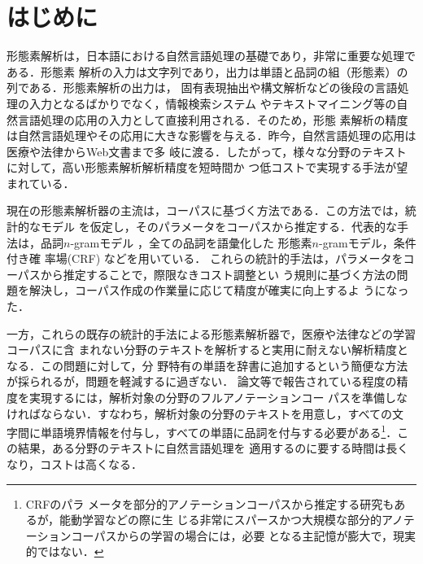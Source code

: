 \documentclass[japanese]{jnlp_1.4}
\begin{document}
\maketitle



\section{はじめに}
\label{section:はじめに}

\vspace{-0.5\baselineskip}
形態素解析は，日本語における自然言語処理の基礎であり，非常に重要な処理である．形態素
解析の入力は文字列であり，出力は単語と品詞の組（形態素）の列である．形態素解析の出力は，
固有表現抽出や構文解析などの後段の言語処理の入力となるばかりでなく，情報検索システム
やテキストマイニング等の自然言語処理の応用の入力として直接利用される．そのため，形態
素解析の精度は自然言語処理やその応用に大きな影響を与える．昨今，自然言語処理の応用は
医療\cite{電子カルテからの副作用関係の自動抽出}や法律\cite{日英特許コーパスからの専門
用語対訳辞書の自動獲得}からWeb文書\cite{2ちゃんねる解析用の形態素解析器の作成}まで多
岐に渡る．したがって，様々な分野のテキストに対して，高い形態素解析解析精度を短時間か
つ低コストで実現する手法が望まれている．

現在の形態素解析器の主流は，コーパスに基づく方法である．この方法では，統計的なモデル
を仮定し，そのパラメータをコーパスから推定する．代表的な手法は，品詞$n$-gramモデル
\cite{統計的言語モデルとN-best探索を用いた日本語形態素解析法}，全ての品詞を語彙化した
形態素$n$-gramモデル\cite{形態素クラスタリングによる形態素解析精度の向上}，条件付き確
率場(CRF) \cite{Conditional.Random.Fields.を用いた日本語形態素解析}などを用いている．
これらの統計的手法は，パラメータをコーパスから推定することで，際限なきコスト調整とい
う規則に基づく方法の問題を解決し，コーパス作成の作業量に応じて精度が確実に向上するよ
うになった．

一方，これらの既存の統計的手法による形態素解析器で，医療や法律などの学習コーパスに含
まれない分野のテキストを解析すると実用に耐えない解析精度となる．この問題に対して，分
野特有の単語を辞書に追加するという簡便な方法が採られるが，問題を軽減するに過ぎない．
論文等で報告されている程度の精度を実現するには，解析対象の分野のフルアノテーションコー
パスを準備しなければならない．すなわち，解析対象の分野のテキストを用意し，すべての文
字間に単語境界情報を付与し，すべての単語に品詞を付与する必要がある\footnote{CRFのパラ
メータを部分的アノテーションコーパスから推定する研究\cite{日本語単語分割の分野適応の
ための部分的アノテーションを用いた条件付き確率場の学習}もあるが，能動学習などの際に生
じる非常にスパースかつ大規模な部分的アノテーションコーパスからの学習の場合には，必要
となる主記憶が膨大で，現実的ではない．}．この結果，ある分野のテキストに自然言語処理を
適用するのに要する時間は長くなり，コストは高くなる．
\end{document}
